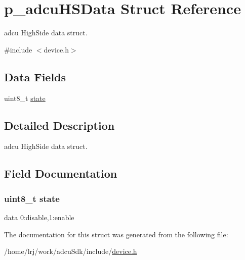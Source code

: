 \hypertarget{structp__adcuHSData}{}\section{p\+\_\+adcu\+H\+S\+Data Struct Reference}
\label{structp__adcuHSData}


adcu High\+Side data struct.  




{\ttfamily \#include $<$device.\+h$>$}

\subsection*{Data Fields}
\begin{DoxyCompactItemize}
\item 
uint8\+\_\+t \hyperlink{structp__adcuHSData_a0b57aa10271a66f3dc936bba1d2f3830}{state}
\end{DoxyCompactItemize}


\subsection{Detailed Description}
adcu High\+Side data struct. 

\subsection{Field Documentation}
\subsubsection[{\texorpdfstring{state}{state}}]{\setlength{\rightskip}{0pt plus 5cm}uint8\+\_\+t state}\hypertarget{structp__adcuHSData_a0b57aa10271a66f3dc936bba1d2f3830}{}\label{structp__adcuHSData_a0b57aa10271a66f3dc936bba1d2f3830}
data 0\+:disable,1\+:enable 

The documentation for this struct was generated from the following file\+:\begin{DoxyCompactItemize}
\item 
/home/lrj/work/adcu\+Sdk/include/\hyperlink{device_8h}{device.\+h}\end{DoxyCompactItemize}
